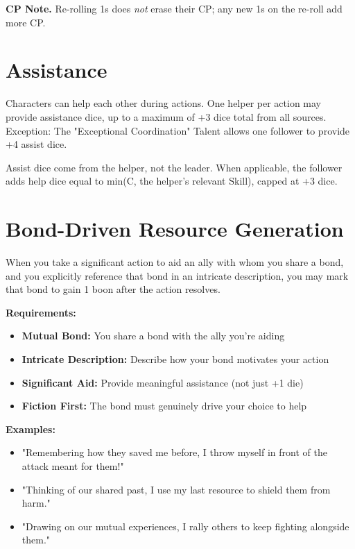 \noindent\textbf{CP Note.} Re-rolling 1s does \emph{not} erase their CP; any new 1s on the re-roll add more CP.

\section{Assistance}

Characters can help each other during actions. One helper per action may provide assistance dice, up to a maximum of +3 dice total from all sources. Exception: The "Exceptional Coordination" Talent  allows one follower to provide +4 assist dice.

Assist dice come from the helper, not the leader. When applicable, the follower adds help dice equal to min(C, the helper's relevant Skill), capped at +3 dice.

\section{Bond-Driven Resource Generation}

When you take a significant action to aid an ally with whom you share a bond, and you explicitly reference that bond in an intricate description, you may mark that bond to gain 1 boon after the action resolves.

\textbf{Requirements:}
\begin{itemize}
    \item \textbf{Mutual Bond:} You share a bond with the ally you're aiding
    \item \textbf{Intricate Description:} Describe how your bond motivates your action
    \item \textbf{Significant Aid:} Provide meaningful assistance (not just +1 die)
    \item \textbf{Fiction First:} The bond must genuinely drive your choice to help
\end{itemize}

\textbf{Examples:}
\begin{itemize}
    \item "Remembering how they saved me before, I throw myself in front of the attack meant for them!"
    \item "Thinking of our shared past, I use my last resource to shield them from harm."
    \item "Drawing on our mutual experiences, I rally others to keep fighting alongside them."
\end{itemize}

